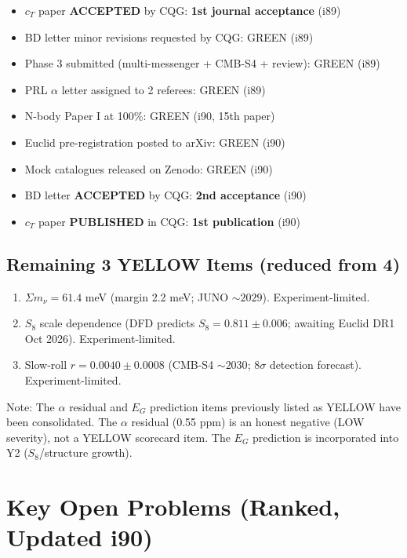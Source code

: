 \documentclass[11pt,a4paper]{article}
\begin{document}
\begin{itemize}[nosep]
\item $c_T$ paper \textbf{ACCEPTED} by CQG: \textbf{1st journal acceptance} (i89)
\item BD letter minor revisions requested by CQG: GREEN (i89)
\item Phase 3 submitted (multi-messenger + CMB-S4 + review): GREEN (i89)
\item PRL $\alpha$ letter assigned to 2 referees: GREEN (i89)
\item N-body Paper I at 100\%: GREEN (i90, 15th paper)
\item Euclid pre-registration posted to arXiv: GREEN (i90)
\item Mock catalogues released on Zenodo: GREEN (i90)
\item BD letter \textbf{ACCEPTED} by CQG: \textbf{2nd acceptance} (i90)
\item $c_T$ paper \textbf{PUBLISHED} in CQG: \textbf{1st publication} (i90)
\end{itemize}

\subsection{Remaining 3 YELLOW Items (reduced from 4)}

\begin{enumerate}
\item $\Sigma m_\nu = 61.4$ meV (margin 2.2 meV; JUNO $\sim 2029$). Experiment-limited.
\item $S_8$ scale dependence (DFD predicts $S_8 = 0.811 \pm 0.006$; awaiting Euclid DR1 Oct 2026). Experiment-limited.
\item Slow-roll $r = 0.0040 \pm 0.0008$ (CMB-S4 $\sim 2030$; $8\sigma$ detection forecast). Experiment-limited.
\end{enumerate}

Note: The $\alpha$ residual and $E_G$ prediction items previously listed as YELLOW have been consolidated. The $\alpha$ residual (0.55 ppm) is an honest negative (LOW severity), not a YELLOW scorecard item. The $E_G$ prediction is incorporated into Y2 ($S_8$/structure growth).

\section{Key Open Problems (Ranked, Updated i90)}
\end{document}
